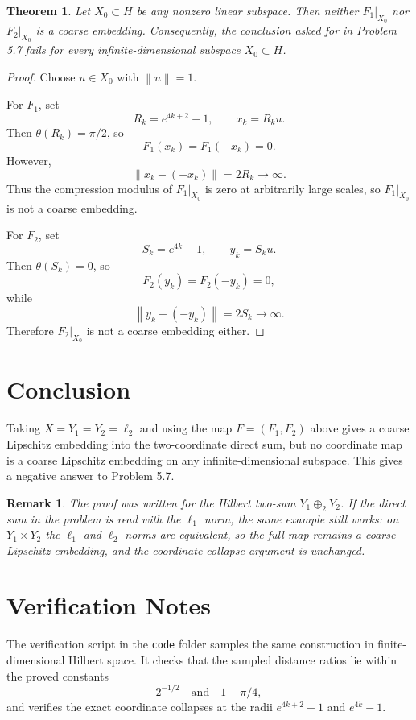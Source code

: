 \documentclass[11pt]{article}
\newtheorem{theorem}{Theorem}
\newtheorem{remark}{Remark}
\newcommand{\norm}[1]{\left\lVert #1 \right\rVert}
\begin{document}
\begin{theorem}
Let $X_0\subset H$ be any nonzero linear subspace. Then neither
$F_1|_{X_0}$ nor $F_2|_{X_0}$ is a coarse embedding. Consequently, the
conclusion asked for in Problem 5.7 fails for every infinite-dimensional
subspace $X_0\subset H$.
\end{theorem}

\begin{proof}
Choose $u\in X_0$ with $\norm{u}=1$.

For $F_1$, set
\[
  R_k=e^{4k+2}-1,\qquad x_k=R_k u.
\]
Then $\theta(R_k)=\pi/2$, so
\[
  F_1(x_k)=F_1(-x_k)=0.
\]
However,
\[
  \norm{x_k-(-x_k)}=2R_k\to\infty.
\]
Thus the compression modulus of $F_1|_{X_0}$ is zero at arbitrarily
large scales, so $F_1|_{X_0}$ is not a coarse embedding.

For $F_2$, set
\[
  S_k=e^{4k}-1,\qquad y_k=S_k u.
\]
Then $\theta(S_k)=0$, so
\[
  F_2(y_k)=F_2(-y_k)=0,
\]
while
\[
  \norm{y_k-(-y_k)}=2S_k\to\infty.
\]
Therefore $F_2|_{X_0}$ is not a coarse embedding either.
\end{proof}

\section*{Conclusion}

Taking $X=Y_1=Y_2=\ell_2$ and using the map $F=(F_1,F_2)$ above gives a
coarse Lipschitz embedding into the two-coordinate direct sum, but no
coordinate map is a coarse Lipschitz embedding on any infinite-dimensional
subspace. This gives a negative answer to Problem 5.7.

\begin{remark}
The proof was written for the Hilbert two-sum $Y_1\oplus_2Y_2$. If the
direct sum in the problem is read with the $\ell_1$ norm, the same
example still works: on $Y_1\times Y_2$ the $\ell_1$ and $\ell_2$ norms
are equivalent, so the full map remains a coarse Lipschitz embedding,
and the coordinate-collapse argument is unchanged.
\end{remark}

\section*{Verification Notes}

The verification script in the \texttt{code} folder samples the same
construction in finite-dimensional Hilbert space. It checks that the
sampled distance ratios lie within the proved constants
\[
  2^{-1/2}
  \quad\text{and}\quad
  1+\pi/4,
\]
and verifies the exact coordinate collapses at the radii
$e^{4k+2}-1$ and $e^{4k}-1$.
\end{document}
